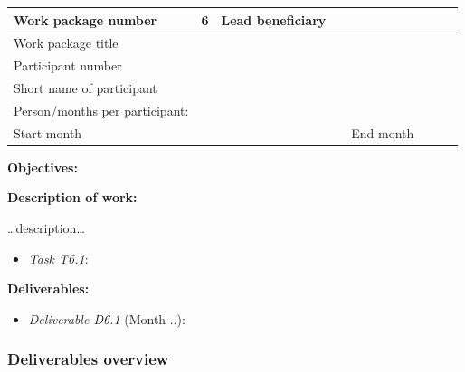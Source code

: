 \documentclass[]{article}
\begin{document}
\begin{longtable}[]{@{}llllllll@{}}
\toprule
Work package number & 6 & Lead beneficiary & & & & &\tabularnewline
\midrule
\endhead
Work package title & & & & & & &\tabularnewline
Participant number & & & & & & &\tabularnewline
Short name of participant & & & & & & &\tabularnewline
Person/months per participant: & & & & & & &\tabularnewline
Start month & & & & End month & & &\tabularnewline
\bottomrule
\end{longtable}

\textbf{Objectives:}

\textbf{Description of work:}

\ldots{}description\ldots{}

\begin{itemize}

\item
  \emph{Task T6.1}:
\end{itemize}

\textbf{Deliverables:}

\begin{itemize}

\item
  \emph{Deliverable D6.1} (Month ..):
\end{itemize}

\subsubsection{Deliverables overview}\label{deliverables-overview}
\end{document}
